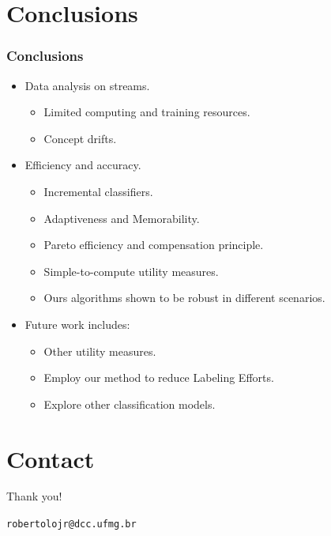 \documentclass[14pt]{beamer}
\begin{document}




\section{Conclusions}

\begin{frame}\frametitle{Conclusions}
\begin{itemize}
\item Data analysis on streams.
\begin{itemize}
\item Limited computing and training resources.
\item Concept drifts.
\end{itemize}
\pause
\item Efficiency and accuracy.
\begin{itemize}
\item Incremental classifiers.
\item Adaptiveness and Memorability.
\item Pareto efficiency and compensation principle.
\item Simple-to-compute utility measures.
\item Ours algorithms shown to be robust in different scenarios.
\end{itemize}
\pause
\item Future work includes:
\begin{itemize}
\item Other utility measures.
\item Employ our method to reduce Labeling Efforts.
\item Explore other classification models.
\end{itemize}
\end{itemize}

\end{frame}

\section{Contact}
\begin{frame}{Thank you!}
\begin{center}
\tt robertolojr@dcc.ufmg.br\\
\end{center}
\end{frame}
\end{document}
